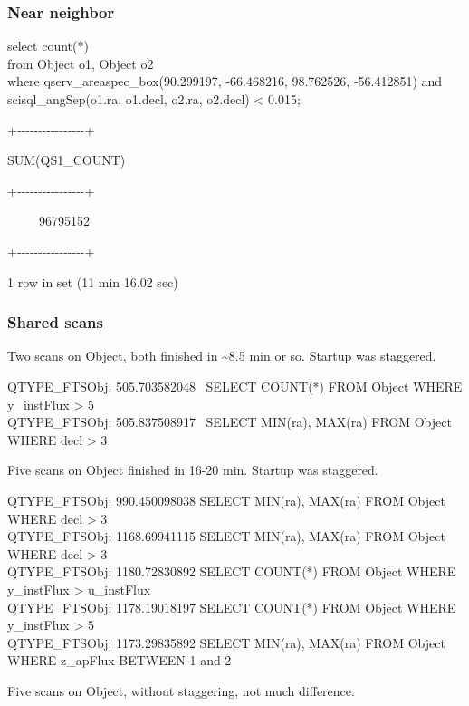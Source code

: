 \subsubsection{Near neighbor}\label{near-neighbor}

select count(*)\\
from Object o1, Object o2\\
where qserv\_areaspec\_box(90.299197, -66.468216, 98.762526, -56.412851)
and scisql\_angSep(o1.ra, o1.decl, o2.ra, o2.decl) \textless{} 0.015;

+-\/-\/-\/-\/-\/-\/-\/-\/-\/-\/-\/-\/-\/-\/-\/-+

\textbar{} SUM(QS1\_COUNT) \textbar{}

+-\/-\/-\/-\/-\/-\/-\/-\/-\/-\/-\/-\/-\/-\/-\/-+

\textbar{} ~ ~ ~ 96795152 \textbar{}

+-\/-\/-\/-\/-\/-\/-\/-\/-\/-\/-\/-\/-\/-\/-\/-+

1 row in set (11 min 16.02 sec)

\subsubsection{Shared scans}\label{shared-scans}

Two scans on Object, both finished in \textasciitilde{}8.5 min or so.
Startup was staggered.

QTYPE\_FTSObj: 505.703582048 ~SELECT COUNT(*) FROM Object WHERE
y\_instFlux \textgreater{} 5\\
QTYPE\_FTSObj: 505.837508917 ~SELECT MIN(ra), MAX(ra) FROM Object WHERE
decl \textgreater{} 3

Five scans on Object finished in 16-20 min. Startup was staggered.

QTYPE\_FTSObj: 990.450098038 SELECT MIN(ra), MAX(ra) FROM Object WHERE
decl \textgreater{} 3\\
QTYPE\_FTSObj: 1168.69941115 SELECT MIN(ra), MAX(ra) FROM Object WHERE
decl \textgreater{} 3\\
QTYPE\_FTSObj: 1180.72830892 SELECT COUNT(*) FROM Object WHERE
y\_instFlux \textgreater{} u\_instFlux\\
QTYPE\_FTSObj: 1178.19018197 SELECT COUNT(*) FROM Object WHERE
y\_instFlux \textgreater{} 5\\
QTYPE\_FTSObj: 1173.29835892 SELECT MIN(ra), MAX(ra) FROM Object WHERE
z\_apFlux BETWEEN 1 and 2

Five scans on Object, without staggering, not much difference:

